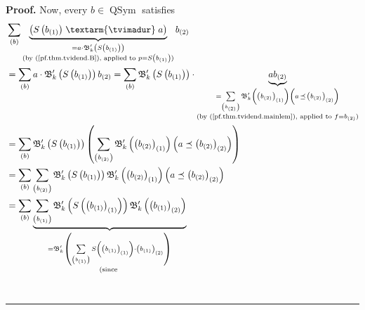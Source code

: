 \documentclass
[numbers=enddot,12pt,final,onecolumn,notitlepage,abstracton]{scrartcl}%
\theoremstyle{definition}
\newenvironment{proof}[1][Proof]{\noindent\textbf{#1.} }{\ \rule{0.5em}{0.5em}}
\newenvironment{verlong}{}{}
\newcommand{\tvi}{\left. \textarm{\tvimadur} \right.}
\let\sumnonlimits\sum
\renewcommand{\sum}{\sumnonlimits\limits}
\begin{document}
\begin{verlong}
\begin{proof}
Now, every $b\in\operatorname*{QSym}$ satisfies%
\begin{align*}
&  \sum_{\left(  b\right)  }\underbrace{\left(  S\left(  b_{\left(  1\right)
}\right)  \tvi a\right)  }_{\substack{=a\cdot\mathfrak{B}_{k}^{\prime}\left(
S\left(  b_{\left(  1\right)  }\right)  \right)  \\\text{(by
(\ref{pf.thm.tvidend.B}), applied to }p=S\left(  b_{\left(  1\right)
}\right)  \text{)}}}b_{\left(  2\right)  }\\
&  =\sum_{\left(  b\right)  }a\cdot\mathfrak{B}_{k}^{\prime}\left(  S\left(
b_{\left(  1\right)  }\right)  \right)  b_{\left(  2\right)  }=\sum_{\left(
b\right)  }\mathfrak{B}_{k}^{\prime}\left(  S\left(  b_{\left(  1\right)
}\right)  \right)  \cdot\underbrace{ab_{\left(  2\right)  }}_{\substack{=\sum
_{\left(  b_{\left(  2\right)  }\right)  }\mathfrak{B}_{k}^{\prime}\left(
\left(  b_{\left(  2\right)  }\right)  _{\left(  1\right)  }\right)  \left(
a\left.  \preceq\right.  \left(  b_{\left(  2\right)  }\right)  _{\left(
2\right)  }\right)  \\\text{(by (\ref{pf.thm.tvidend.mainlem}), applied to
}f=b_{\left(  2\right)  }\text{)}}}\\
&  =\sum_{\left(  b\right)  }\mathfrak{B}_{k}^{\prime}\left(  S\left(
b_{\left(  1\right)  }\right)  \right)  \left(  \sum_{\left(  b_{\left(
2\right)  }\right)  }\mathfrak{B}_{k}^{\prime}\left(  \left(  b_{\left(
2\right)  }\right)  _{\left(  1\right)  }\right)  \left(  a\left.
\preceq\right.  \left(  b_{\left(  2\right)  }\right)  _{\left(  2\right)
}\right)  \right) \\
&  =\sum_{\left(  b\right)  }\sum_{\left(  b_{\left(  2\right)  }\right)
}\mathfrak{B}_{k}^{\prime}\left(  S\left(  b_{\left(  1\right)  }\right)
\right)  \mathfrak{B}_{k}^{\prime}\left(  \left(  b_{\left(  2\right)
}\right)  _{\left(  1\right)  }\right)  \left(  a\left.  \preceq\right.
\left(  b_{\left(  2\right)  }\right)  _{\left(  2\right)  }\right) \\
&  =\sum_{\left(  b\right)  }\underbrace{\sum_{\left(  b_{\left(  1\right)
}\right)  }\mathfrak{B}_{k}^{\prime}\left(  S\left(  \left(  b_{\left(
1\right)  }\right)  _{\left(  1\right)  }\right)  \right)  \mathfrak{B}%
_{k}^{\prime}\left(  \left(  b_{\left(  1\right)  }\right)  _{\left(
2\right)  }\right)  }_{\substack{=\mathfrak{B}_{k}^{\prime}\left(
\sum_{\left(  b_{\left(  1\right)  }\right)  }S\left(  \left(  b_{\left(
1\right)  }\right)  _{\left(  1\right)  }\right)  \cdot\left(  b_{\left(
1\right)  }\right)  _{\left(  2\right)  }\right)  \\\text{(since }%
}}
\end{align*}
\end{proof}
\end{verlong}
\end{document}
